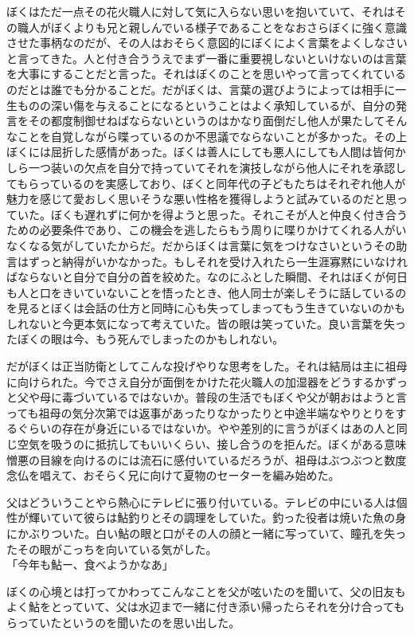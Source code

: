 \documentclass[b5j,twoside,twocolumn]{utarticle}
\begin{document}
ぼくはただ一点その花火職人に対して気に入らない思いを抱いていて、それはその職人がぼくよりも兄と親しんでいる様子であることをなおさらぼくに強く意識させた事柄なのだが、その人はおそらく意図的にぼくによく言葉をよくしなさいと言ってきた。人と付き合ううえでまず一番に重要視しないといけないのは言葉を大事にすることだと言った。それはぼくのことを思いやって言ってくれているのだとは誰でも分かることだ。だがぼくは、言葉の選びようによっては相手に一生ものの深い傷を与えることになるということはよく承知しているが、自分の発言をその都度制御せねばならないというのはかなり面倒だし他人が果たしてそんなことを自覚しながら喋っているのか不思議でならないことが多かった。その上ぼくには屈折した感情があった。ぼくは善人にしても悪人にしても人間は皆何かしら一つ装いの欠点を自分で持っていてそれを演技しながら他人にそれを承認してもらっているのを実感しており、ぼくと同年代の子どもたちはそれぞれ他人が魅力を感じて愛おしく思いそうな悪い性格を獲得しようと試みているのだと思っていた。ぼくも遅れずに何かを得ようと思った。それこそが人と仲良く付き合うための必要条件であり、この機会を逃したらもう周りに喋りかけてくれる人がいなくなる気がしていたからだ。だからぼくは言葉に気をつけなさいというその助言はずっと納得がいかなかった。もしそれを受け入れたら一生涯寡黙にいなければならないと自分で自分の首を絞めた。なのにふとした瞬間、それはぼくが何日も人と口をきいていないことを悟ったとき、他人同士が楽しそうに話しているのを見るとぼくは会話の仕方と同時に心も失ってしまってもう生きていないのかもしれないと今更本気になって考えていた。皆の眼は笑っていた。良い言葉を失ったぼくの眼は今、もう死んでしまったのかもしれない。


だがぼくは正当防衛としてこんな投げやりな思考をした。それは結局は主に祖母に向けられた。今でさえ自分が面倒をかけた花火職人の加湿器をどうするかずっと父や母に毒づいているではないか。普段の生活でもぼくや父が朝おはようと言っても祖母の気分次第では返事があったりなかったりと中途半端なやりとりをするぐらいの存在が身近にいるではないか。やや差別的に言うがぼくはあの人と同じ空気を吸うのに抵抗してもいいくらい、接し合うのを拒んだ。ぼくがある意味憎悪の目線を向けるのには流石に感付いているだろうが、祖母はぶつぶつと数度念仏を唱えて、おそらく兄に向けて夏物のセーターを編み始めた。


父はどういうことやら熱心にテレビに張り付いている。テレビの中にいる人は個性が輝いていて彼らは鮎釣りとその調理をしていた。釣った役者は焼いた魚の身にかぶりついた。白い鮎の眼と口がその人の顔と一緒に写っていて、瞳孔を失ったその眼がこっちを向いている気がした。\\
「今年も鮎ー、食べようかなあ」


ぼくの心境とは打ってかわってこんなことを父が呟いたのを聞いて、父の旧友もよく鮎をとっていて、父は水辺まで一緒に付き添い帰ったらそれを分け合ってもらっていたというのを聞いたのを思い出した。
\end{document}
